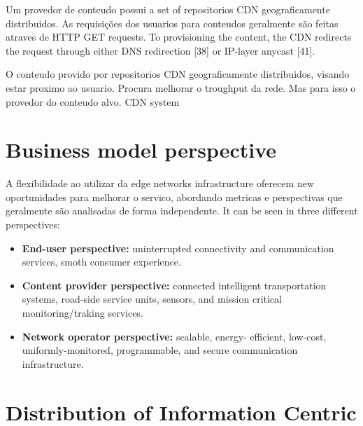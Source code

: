Um provedor de conteudo possui a set of repositorios CDN geograficamente distribuidos. As requisições dos usuarios para conteudos geralmente são feitas atraves de HTTP GET requests. To provisioning the content, the CDN redirects the request through either DNS redirection [38] or IP-layer anycast [41]. 

O conteudo provido por repositorios CDN geograficamente distribuidos, visando estar proximo ao usuario. Procura melhorar o troughput da rede. Mas para isso o provedor do conteudo alvo.  CDN system


    
\section{Business model perspective}

A flexibilidade ao utilizar da edge networks infrastructure oferecem new oportunidades para melhorar o servico, abordando metricas e perspectivas que geralmente são analisadas de forma independente. It can be seen in three different perspectives:


\begin{itemize}

\item \textbf{End-user perspective:} uninterrupted connectivity and communication services, smoth consumer experience.

\item \textbf{Content provider perspective:} connected intelligent 	transportation systems, road-side service units, sensors, and mission critical monitoring/traking services.

\item \textbf{Network operator perspective:}  scalable, energy- efficient, low-cost, uniformly-monitored, programmable, and secure communication infrastructure.

\end{itemize}

\section{Distribution of Information Centric}



